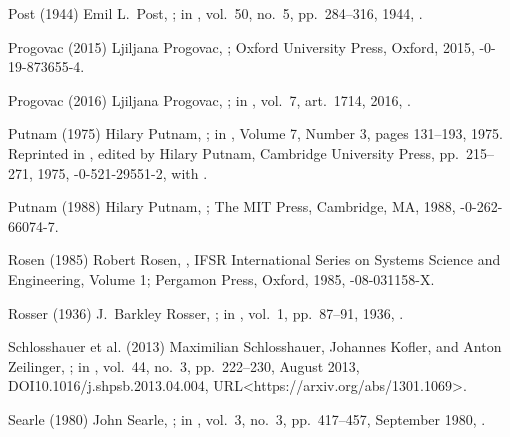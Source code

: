 \biblabel Post (1944)
Emil L.\ Post,
;
in ,
vol.\ 50, no.~5, pp.\ 284--316, 1944,
.

\biblabel Progovac (2015)
Ljiljana Progovac,
;
Oxford University Press, Oxford, 2015,
-0-19-873655-4.

\biblabel Progovac (2016)
Ljiljana Progovac,
;
in ,
vol.\ 7, art.\ 1714, 2016,
.

\biblabel Putnam (1975)
Hilary Putnam,
;
in ,
Volume 7, Number 3, pages 131--193, 1975.
Reprinted in
,
edited by Hilary Putnam,
Cambridge University Press, pp.\ 215--271, 1975,
-0-521-29551-2, with
.

\biblabel Putnam (1988)
Hilary Putnam,
;
The MIT Press, Cambridge, MA, 1988,
-0-262-66074-7.

\biblabel Rosen (1985)
Robert Rosen,
,
 IFSR International Series on
 Systems Science and Engineering, Volume 1;
 Pergamon Press, Oxford, 1985,
-08-031158-X.

\biblabel Rosser (1936)
J.\ Barkley Rosser,
;
in ,
vol.\ 1, pp.\ 87--91, 1936,
.

\biblabel Schlosshauer et al. (2013)
Maximilian Schlosshauer, Johannes Kofler, and Anton Zeilinger,
;
in ,
vol.\ 44, no.\ 3, pp.\ 222--230, August 2013,
DOI{10.1016/j.shpsb.2013.04.004},
URL<https://arxiv.org/abs/1301.1069>.

\biblabel Searle (1980)
John Searle,
;
in ,
vol.\ 3, no.\ 3, pp.\ 417--457, September 1980,
.


